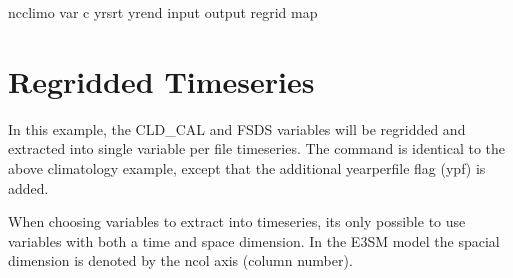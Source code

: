 \documentclass[letterpaper,10pt,english]{sphinxmanual}
\begin{document}
\begin{sphinxVerbatim}[commandchars=\\\{\}]
ncclimo 
   
  \PYGZhy{}\PYGZhy{}var 
  \PYGZhy{}c  
  \PYGZhy{}\PYGZhy{}yr\PYGZus{}srt 
  \PYGZhy{}\PYGZhy{}yr\PYGZus{}end 
  \PYGZhy{}\PYGZhy{}input 
  \PYGZhy{}\PYGZhy{}output 
  \PYGZhy{}\PYGZhy{}regrid
  \PYGZhy{}\PYGZhy{}map
\end{sphinxVerbatim}


\section{Regridded Timeseries}
\label{\detokenize{atm_regrid:regridded-timeseries}}
In this example, the CLD\_CAL and FSDS variables will be regridded and extracted into single variable per file time\sphinxhyphen{}series. The command is identical to the
above climatology example, except that the additional year\sphinxhyphen{}per\sphinxhyphen{}file flag (\textendash{}ypf) is added.

When choosing variables to extract into time\sphinxhyphen{}series, its only possible to use variables with both a time and space dimension. In the E3SM model
the spacial dimension is denoted by the ncol axis (column number).
\end{document}
